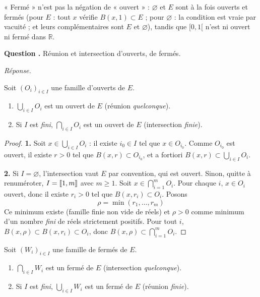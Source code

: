 \documentclass[11pt]{article}
\newcounter{qnum}
\newcommand{\question}[1]{%
\stepcounter{qnum}%
\bigskip
\noindent\textbf{Question \theqnum.} #1\par}
\newcommand{\reponse}{\noindent\textit{Réponse.}\ }
\begin{document}
\begin{remarque}
« Fermé » n'est pas la négation de « ouvert » : $\varnothing$ et $E$ sont à la fois ouverts et fermés (pour $E$ : tout $x$ vérifie $B(x,1)\subset E$ ; pour $\varnothing$ : la condition est vraie par vacuité ; et leurs complémentaires sont $E$ et $\varnothing$), tandis que $[0,1[$ n'est ni ouvert ni fermé dans $\mathbb{R}$.
\end{remarque}

\question{Réunion et intersection d'ouverts, de fermés.}
\reponse

\begin{prop}
\label{prop:union-ouverts}
Soit $(O_i)_{i\in I}$ une famille d'ouverts de $E$.
\begin{enumerate}
\item $\displaystyle\bigcup_{i\in I}O_i$ est un ouvert de $E$ (réunion \emph{quelconque}).
\item Si $I$ est \emph{fini}, $\displaystyle\bigcap_{i\in I}O_i$ est un ouvert de $E$ (intersection \emph{finie}).
\end{enumerate}
\end{prop}

\begin{proof}
\textbf{1.} Soit $x\in\bigcup_{i\in I}O_i$ : il existe $i_0\in I$ tel que $x\in O_{i_0}$. Comme $O_{i_0}$ est ouvert, il existe $r>0$ tel que $B(x,r)\subset O_{i_0}$, et a fortiori $B(x,r)\subset\bigcup_{i\in I}O_i$.

\textbf{2.} Si $I=\varnothing$, l'intersection vaut $E$ par convention, qui est ouvert. Sinon, quitte à renuméroter, $I=\llbracket 1,m \rrbracket$ avec $m\geq 1$. Soit $x\in\bigcap_{i=1}^{m}O_i$. Pour chaque $i$, $x\in O_i$ ouvert, donc il existe $r_i>0$ tel que $B(x,r_i)\subset O_i$. Posons
\[\rho = \min(r_1,\dots,r_m)\]
Ce minimum existe (famille finie non vide de réels) et $\rho>0$ comme minimum d'un nombre \emph{fini} de réels strictement positifs. Pour tout $i$, $B(x,\rho)\subset B(x,r_i)\subset O_i$, donc $B(x,\rho)\subset\bigcap_{i=1}^{m}O_i$.
\end{proof}

\begin{coro}
\label{coro:fermes}
Soit $(W_i)_{i\in I}$ une famille de fermés de $E$.
\begin{enumerate}
\item $\displaystyle\bigcap_{i\in I}W_i$ est un fermé de $E$ (intersection \emph{quelconque}).
\item Si $I$ est \emph{fini}, $\displaystyle\bigcup_{i\in I}W_i$ est un fermé de $E$ (réunion \emph{finie}).
\end{enumerate}
\end{coro}
\end{document}
